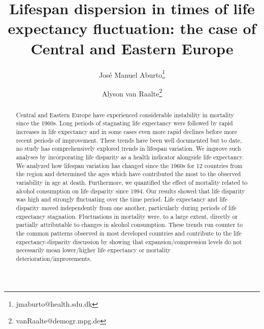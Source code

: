 \documentclass{article}
\title{Lifespan dispersion in times of life expectancy fluctuation: the case of Central and Eastern Europe}
\author[1]{Jos\'e Manuel Aburto\thanks{jmaburto@health.sdu.dk}}
\author[2]{Alyson van Raalte\thanks{vanRaalte@demogr.mpg.de}}
\affil[1]{Department of Public Health, Max Planck Center on the Biodemography of Aging, University of Southern Denmark}
\affil[2]{Max Planck Institute for Demographic Research}
\begin{document}
\maketitle

\begin{abstract}
Central and Eastern Europe have experienced considerable instability in mortality since the 1960s. Long periods of stagnating life expectancy were followed by rapid increases in life expectancy and in some cases even more rapid declines before more recent periods of improvement. These trends have been well documented but to date, no study has comprehensively explored trends in lifespan variation.  We improve such analyses by incorporating life disparity as a health indicator alongside life expectancy. We analyzed how lifespan variation has changed since the 1960s for 12 countries from the region and determined the ages which have contributed the most to the observed variability in age at death. Furthermore, we quantified the effect of mortality related to alcohol consumption on life disparity since 1994. Our results showed that life disparity was high and strongly fluctuating over the time period. Life expectancy and life disparity moved independently from one another, particularly during periods of life expectancy stagnation. Fluctuations in mortality were, to a large extent, directly or partially attributable to changes in alcohol consumption. These trends run counter to the common patterns observed in most developed countries and contribute to the life expectancy-disparity discussion by showing that expansion/compression levels do not necessarily mean lower/higher life expectancy or mortality deterioration/improvements. 
\end{abstract}


\newpage
\end{document}
